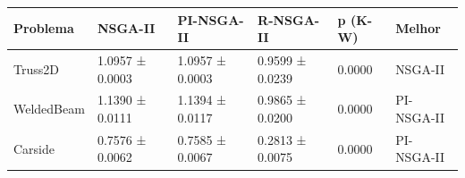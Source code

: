 \begin{tabular}{llllll}
\toprule
Problema & NSGA-II & PI-NSGA-II & R-NSGA-II & p (K-W) & Melhor \\
\midrule
Truss2D & 1.0957 ± 0.0003 & 1.0957 ± 0.0003 & 0.9599 ± 0.0239 & 0.0000 & NSGA-II \\
WeldedBeam & 1.1390 ± 0.0111 & 1.1394 ± 0.0117 & 0.9865 ± 0.0200 & 0.0000 & PI-NSGA-II \\
Carside & 0.7576 ± 0.0062 & 0.7585 ± 0.0067 & 0.2813 ± 0.0075 & 0.0000 & PI-NSGA-II \\
\bottomrule
\end{tabular}
